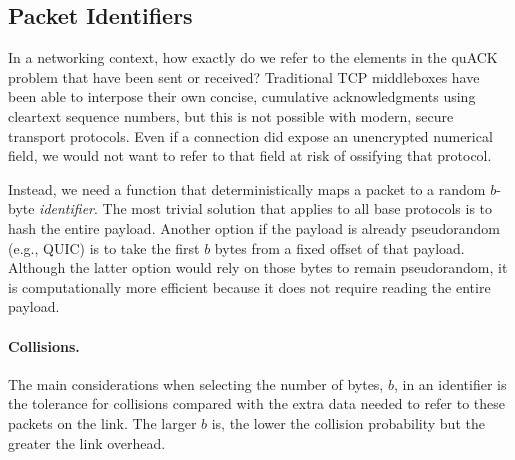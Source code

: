 

\subsection{Packet Identifiers}

In a networking context, how exactly do we refer to the elements
in the quACK problem that have been sent or received?
Traditional TCP middleboxes have been able to interpose their
own concise, cumulative acknowledgments using cleartext sequence numbers, but
this is not possible with modern, secure transport protocols. Even if a
connection did expose an unencrypted numerical field, we would not want to
refer to that field at risk of ossifying that protocol.

Instead, we need a function that deterministically maps
a packet to a random $b$-byte \emph{identifier}. The most trivial solution
that applies to all base protocols is
to hash the entire payload. Another option if the payload is already
pseudorandom (e.g., QUIC) is to take the first $b$ bytes from a fixed
offset of that payload. Although the latter option would rely on those bytes
to remain pseudorandom, it is computationally more efficient because it
does not require reading the entire payload.

\paragraph{Collisions.}
The main considerations when selecting the number of bytes, $b$, in an
identifier is the tolerance for collisions compared with the extra data
needed to refer to these packets on the link. The larger $b$ is, the lower
the collision probability but the greater the link overhead.

